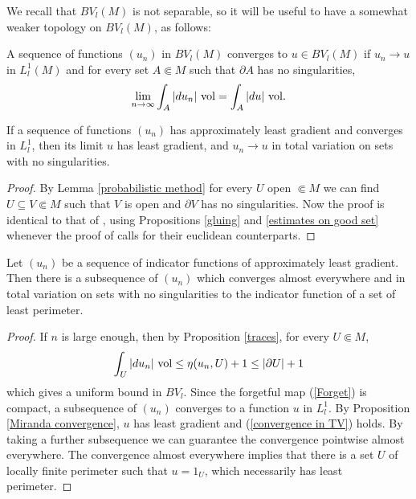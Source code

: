 We recall that $BV_l(M)$ is not separable, so it will be useful to have a somewhat weaker topology on $BV_l(M)$, as follows:

\begin{definition}
A sequence of functions $(u_n)$ in $BV_l(M)$ converges  to $u \in BV_l(M)$ if $u_n \to u$ in $L^1_l(M)$ and for every set $A \Subset M$ such that $\partial A$ has no singularities,
\begin{equation}\label{convergence in TV}
\lim_{n \to \infty} \int_A |du_n| ~\mathrm{vol} = \int_A |du| ~\mathrm{vol}.
\end{equation}
\end{definition}

\begin{proposition}\label{Miranda convergence}
If a sequence of functions $(u_n)$ has approximately least gradient and converges in $L^1_l$, then its limit $u$ has least gradient, and $u_n \to u$ in total variation on sets with no singularities.
\end{proposition}
\begin{proof}
By Lemma \ref{probabilistic method} for every $U$ open $\Subset M$ we can find $U \subseteq V \Subset M$ such that $V$ is open and $\partial V$ has no singularities.
Now the proof is identical to that of \cite[Teorema 3]{Miranda67}, using Propositions \ref{gluing} and \ref{estimates on good set} whenever the proof of \cite[Teorema 3]{Miranda67} calls for their euclidean counterparts.
\end{proof}

\begin{corollary}\label{compactness}
Let $(u_n)$ be a sequence of indicator functions of approximately least gradient.
Then there is a subsequence of $(u_n)$ which converges almost everywhere and in total variation on sets with no singularities to the indicator function of a set of least perimeter.
\end{corollary}
\begin{proof}
If $n$ is large enough, then by Proposition \ref{traces}, for every $U \Subset M$,
$$\int_U |du_n| ~\mathrm{vol} \leq \eta(u_n, U) + 1 \leq |\partial U| + 1$$
which gives a uniform bound in $BV_l$.
Since the forgetful map (\ref{Forget}) is compact, a subsequence of $(u_n)$ converges to a function $u$ in $L^1_l$.
By Proposition \ref{Miranda convergence}, $u$ has least gradient and (\ref{convergence in TV}) holds.
By taking a further subsequence we can guarantee the convergence pointwise almost everywhere.
The convergence almost everywhere implies that there is a set $U$ of locally finite perimeter such that $u = 1_U$, which necessarily has least perimeter.
\end{proof}

